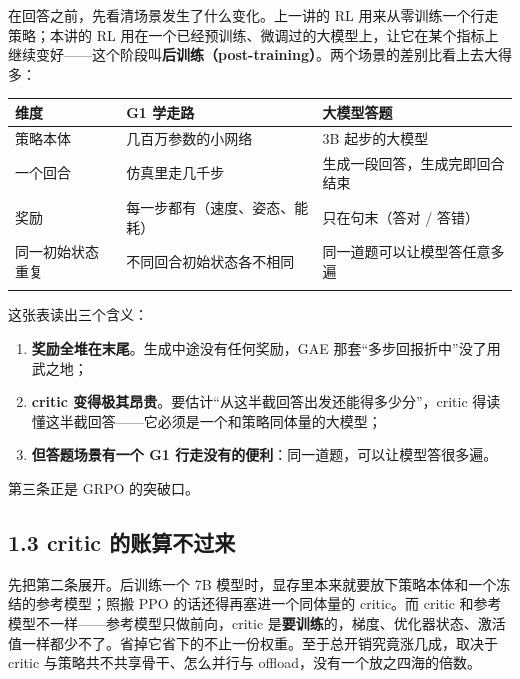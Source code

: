 \documentclass[
  chinese,
]{ctexart}
\providecommand{\tightlist}{%
  \setlength{\itemsep}{0pt}\setlength{\parskip}{0pt}}
\begin{document}
在回答之前，先看清场景发生了什么变化。上一讲的 RL
用来从零训练一个行走策略；本讲的 RL
用在一个已经预训练、微调过的大模型上，让它在某个指标上继续变好------这个阶段叫\textbf{后训练（post-training）}。两个场景的差别比看上去大得多：

\begin{center}
\begin{tabular}{@{}>{\raggedright\arraybackslash}p{} >{\raggedright\arraybackslash}p{} >{\raggedright\arraybackslash}p{}@{}}
\toprule\noalign{}
维度 & G1 学走路 & 大模型答题 \\
\midrule\noalign{}
策略本体 & 几百万参数的小网络 & 3B 起步的大模型 \\
一个回合 & 仿真里走几千步 & 生成一段回答，生成完即回合结束 \\
奖励 & 每一步都有（速度、姿态、能耗） & 只在句末（答对 / 答错） \\
同一初始状态重复 & 不同回合初始状态各不相同 & 同一道题可以让模型答任意多遍 \\
\bottomrule\noalign{}
\end{tabular}
\end{center}

这张表读出三个含义：

\begin{enumerate}
\def\labelenumi{\arabic{enumi}.}
\tightlist
\item
  \textbf{奖励全堆在末尾}。生成中途没有任何奖励，GAE
  那套``多步回报折中''没了用武之地；
\item
  \textbf{critic
  变得极其昂贵}。要估计``从这半截回答出发还能得多少分''，critic
  得读懂这半截回答------它必须是一个和策略同体量的大模型；
\item
  \textbf{但答题场景有一个 G1
  行走没有的便利}：同一道题，可以让模型答很多遍。
\end{enumerate}

第三条正是 GRPO 的突破口。

\subsection{1.3 critic
的账算不过来}\label{critic-ux7684ux8d26ux7b97ux4e0dux8fc7ux6765}

先把第二条展开。后训练一个 7B
模型时，显存里本来就要放下策略本体和一个冻结的参考模型；照搬 PPO
的话还得再塞进一个同体量的 critic。而 critic
和参考模型不一样------参考模型只做前向，critic
是\textbf{要训练}的，梯度、优化器状态、激活值一样都少不了。省掉它省下的不止一份权重。至于总开销究竟涨几成，取决于
critic 与策略共不共享骨干、怎么并行与 offload，没有一个放之四海的倍数。
\end{document}
